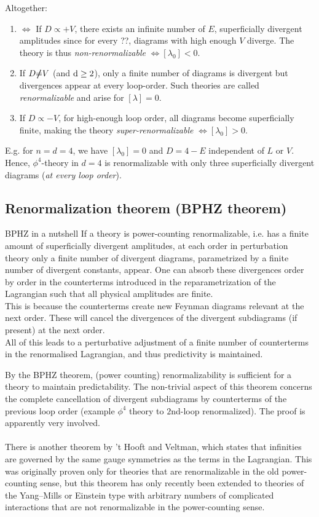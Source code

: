 Altogether:
\begin{enumerate}
	\item $\Leftrightarrow$ If $D\propto + V$, there exists an infinite number of $E$, superficially divergent amplitudes since for every ??, diagrams with high enough $V$ diverge. The theory is thus \emph{non-renormalizable} $\Leftrightarrow [\lambda_0] <0$.
	\item If $D\slashed{\neq} V$ (and $\mathrm{d} \geq 2$), only a finite number of diagrams is divergent but divergences appear at every loop-order. Such theories are called \emph{renormalizable} and arise for $[\lambda]=0$.
	\item If $D \propto -V$, for high-enough loop order, all diagrams become superficially finite, making the theory \emph{super-renormalizable} $\Leftrightarrow [\lambda_0] >0$.
\end{enumerate}
E.g. for $n=d=4$, we have $[\lambda_0 ] =0$ and $D=4-E$ independent of $L$ or $V$. Hence, $\phi^4$-theory in $d=4$ is renormalizable with only three superficially divergent diagrams (\emph{at every loop order}).

\subsection{Renormalization theorem (BPHZ theorem)}
\begin{mybox}{BPHZ in a nutshell}
	If a theory is power-counting renormalizable, i.e. has a finite amount of superficially divergent amplitudes, at each order in perturbation theory only a finite number of divergent diagrams, parametrized by a finite number of divergent constants, appear. One can absorb these
	divergences order by order in the counterterms introduced in the reparametrization of the Lagrangian such that all
	physical amplitudes are finite.\\
	This is because the counterterms create new Feynman diagrams relevant at the next order. These will cancel
	the divergences of the divergent subdiagrams (if present) at the next order.\\	
	All of this leads to a perturbative adjustment of a finite number of counterterms in the renormalised Lagrangian, and thus predictivity is maintained.
\end{mybox}

By the BPHZ theorem, (power counting) renormalizability is sufficient for a theory to maintain predictability. The non-trivial aspect of this theorem concerns the complete cancellation of divergent subdiagrams by counterterms of the previous loop order (example $\phi^4$ theory to $2$nd-loop renormalized). The proof is apparently very involved.\\
\\
There is another theorem by 't Hooft and Veltman, which states that infinities are governed by the same
gauge symmetries as the terms in the Lagrangian. This was originally proven only for theories that are renormalizable in
the old power-counting sense, but this theorem has only recently
been extended to theories of the Yang–Mills or Einstein type
with arbitrary numbers of complicated interactions that are not
renormalizable in the power-counting sense.


